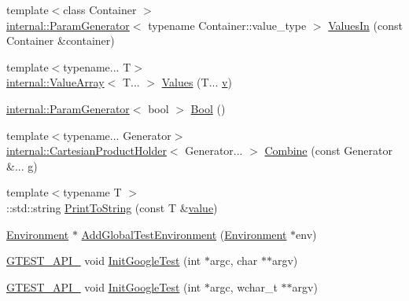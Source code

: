 \begin{DoxyCompactItemize}
\item 
{\footnotesize template$<$class Container $>$ }\\\mbox{\hyperlink{classtesting_1_1internal_1_1_param_generator}{internal\+::\+Param\+Generator}}$<$ typename Container\+::value\+\_\+type $>$ \mbox{\hyperlink{namespacetesting_aa67d0c8470c5f69fcfcacc9e775fa982}{Values\+In}} (const Container \&container)
\item 
{\footnotesize template$<$typename... T$>$ }\\\mbox{\hyperlink{classtesting_1_1internal_1_1_value_array}{internal\+::\+Value\+Array}}$<$ T... $>$ \mbox{\hyperlink{namespacetesting_abd3c87b40c2a0663691c9b617ed5fcc2}{Values}} (T... \mbox{\hyperlink{_important_values_8h_aaad811047eb9ea3edb6ec2bbeddb2b2b}{v}})
\item 
\mbox{\hyperlink{classtesting_1_1internal_1_1_param_generator}{internal\+::\+Param\+Generator}}$<$ bool $>$ \mbox{\hyperlink{namespacetesting_a1a0ebe4f77126fb464a8286ce6389bb9}{Bool}} ()
\item 
{\footnotesize template$<$typename... Generator$>$ }\\\mbox{\hyperlink{classtesting_1_1internal_1_1_cartesian_product_holder}{internal\+::\+Cartesian\+Product\+Holder}}$<$ Generator... $>$ \mbox{\hyperlink{namespacetesting_aa79138ff6a7f479fea4fed96a677f083}{Combine}} (const Generator \&... g)
\item 
{\footnotesize template$<$typename T $>$ }\\\+::std\+::string \mbox{\hyperlink{namespacetesting_aa5717bb1144edd1d262d310ba70c82ed}{Print\+To\+String}} (const T \&\mbox{\hyperlink{_obj__test_2lib_2googletest-master_2googlemock_2test_2gmock-matchers__test_8cc_a337b8a670efc0b086ad3af163f3121b6}{value}})
\item 
\mbox{\hyperlink{classtesting_1_1_environment}{Environment}} $\ast$ \mbox{\hyperlink{namespacetesting_a224caeebdb6586b728d204367fea1087}{Add\+Global\+Test\+Environment}} (\mbox{\hyperlink{classtesting_1_1_environment}{Environment}} $\ast$env)
\item 
\mbox{\hyperlink{_obj__test_2lib_2googletest-release-1_88_81_2googletest_2include_2gtest_2internal_2gtest-port_8h_aa73be6f0ba4a7456180a94904ce17790}{G\+T\+E\+S\+T\+\_\+\+A\+P\+I\+\_\+}} void \mbox{\hyperlink{namespacetesting_afd726ae08c9bd16dc52f78c822d9946b}{Init\+Google\+Test}} (int $\ast$argc, char $\ast$$\ast$argv)
\item 
\mbox{\hyperlink{_obj__test_2lib_2googletest-release-1_88_81_2googletest_2include_2gtest_2internal_2gtest-port_8h_aa73be6f0ba4a7456180a94904ce17790}{G\+T\+E\+S\+T\+\_\+\+A\+P\+I\+\_\+}} void \mbox{\hyperlink{namespacetesting_ae5a88709a4a7529e30c83242156556b3}{Init\+Google\+Test}} (int $\ast$argc, wchar\+\_\+t $\ast$$\ast$argv)

\end{DoxyCompactItemize}
